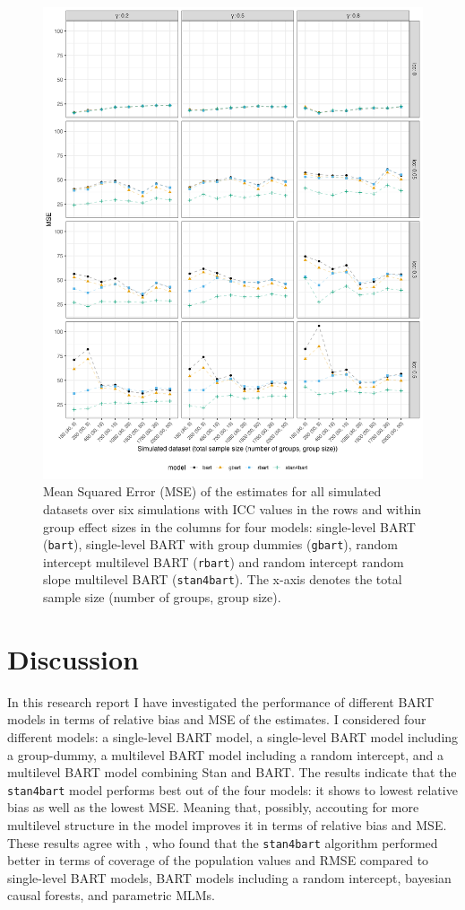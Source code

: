 \documentclass[10pt, a4paper, titlepage]{article}
\begin{document}
\begin{figure}[H]
\caption{Mean Squared Error (MSE) of the estimates for all simulated datasets over six simulations with ICC values in the rows and within group effect sizes in the columns for four models: single-level BART (\texttt{bart}), single-level BART with group dummies (\texttt{gbart}), random intercept multilevel BART (\texttt{rbart}) and random intercept random slope multilevel BART (\texttt{stan4bart}). The x-axis denotes the total sample size (number of groups, group size).}
\centering
\label{fig:mseplots}
\includegraphics[width=1\textwidth]{mseplot.png}
\end{figure}

\newpage
\section{Discussion}

In this research report I have investigated the performance of different BART models in terms of relative bias and MSE of the estimates. I considered four different models: a single-level BART model, a single-level BART model including a group-dummy, a multilevel BART model including a random intercept, and a multilevel BART model combining Stan and BART. The results indicate that the \texttt{stan4bart} model performs best out of the four models: it shows to lowest relative bias as well as the lowest MSE. Meaning that, possibly, accouting for more multilevel structure in the model improves it in terms of relative bias and MSE. These results agree with \citet{dorie2022}, who found that the \texttt{stan4bart} algorithm performed better in terms of coverage of the population values and RMSE compared to single-level BART models, BART models including a random intercept, bayesian causal forests, and parametric MLMs.
\end{document}
